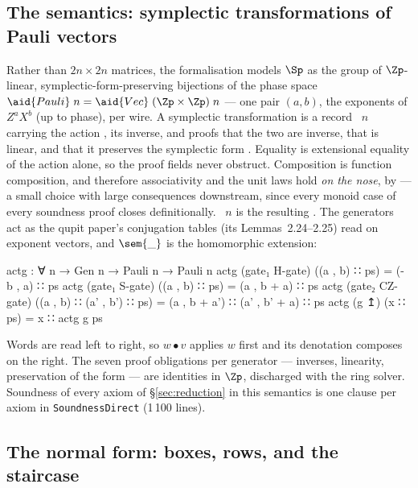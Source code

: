 \subsection{The semantics: symplectic transformations of Pauli vectors}\label{sec:spsem}

Rather than $2n \times 2n$ matrices, the formalisation models $\Sp$ as
the group of $\Zp$-linear, symplectic-form-preserving bijections of the
phase space $\aid{Pauli}\;n = \aid{Vec}\;(\Zp \times \Zp)\;n$ --- one
pair $(a,b)$, the exponents of $Z^{a}X^{b}$ (up to phase), per wire.
A symplectic transformation is a record ~$n$ carrying
the action , its inverse, and proofs that the two are inverse,
that  is linear, and that it preserves the symplectic form
.  Equality is extensional equality of the action alone, so
the proof fields never obstruct.  Composition is function composition,
and therefore associativity and the unit laws hold \emph{on the nose},
by  --- a small choice with large consequences downstream,
since every monoid case of every soundness proof closes definitionally.
~$n$ is the resulting .  The generators act
as the qupit paper's conjugation tables (its Lemmas~2.24--2.25) read on
exponent vectors, and $\sem{\_}$ is the homomorphic extension:

\begingroup\renewcommand{\AgdaCodeStyle}{\footnotesize}
\begin{code}
actg : ∀ {n} → Gen n → Pauli n → Pauli n
actg (gate₁ H-gate)  ((a , b) ∷ ps)             = (- b , a) ∷ ps
actg (gate₁ S-gate)  ((a , b) ∷ ps)             = (a , b + a) ∷ ps
actg (gate₂ CZ-gate) ((a , b) ∷ (a' , b') ∷ ps) = (a , b + a') ∷ (a' , b' + a) ∷ ps
actg (g ↥)           (x ∷ ps)                   = x ∷ actg g ps
\end{code}
\endgroup

\noindent Words are read left to right, so $w \bullet v$ applies $w$
first and its denotation composes on the right.  The seven proof
obligations per
generator --- inverses, linearity, preservation of the form --- are
identities in $\Zp$, discharged with the ring solver.  Soundness of
every axiom of \S\ref{sec:reduction} in this semantics is one clause per
axiom in \texttt{SoundnessDirect} (1\,100 lines).

\subsection{The normal form: boxes, rows, and the staircase}\label{sec:nf}

